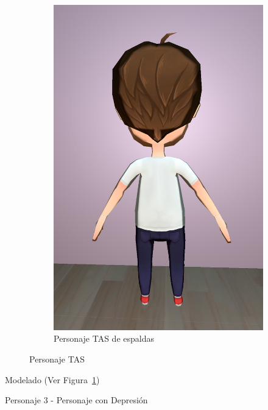 \documentclass[12pt, a4paper,twoside,titlepage]{book}
\begin{document}
\begin{figure}
\begin{subfigure}{.5\textwidth}
  \includegraphics[width=.95\linewidth]{TGF/Artes/TAS_back.png}
  \caption{Personaje TAS de espaldas}
\end{subfigure}
\caption{Personaje TAS}
\label{fig:ArtesTAS2}
\end{figure}

 Modelado (Ver Figura~\ref{fig:ArtesTAS2})
 
 

Personaje 3 - Personaje con Depresión
 
\end{document}
